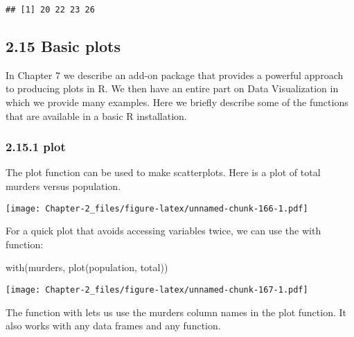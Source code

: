\documentclass[
]{article}
\newenvironment{Shaded}{\begin{snugshade}}{\end{snugshade}}
\newcommand{\DecValTok}[1]{\textcolor[rgb]{0.00,0.00,0.81}{#1}}
\newcommand{\FunctionTok}[1]{\textcolor[rgb]{0.00,0.00,0.00}{#1}}
\newcommand{\NormalTok}[1]{#1}
\newcommand{\OtherTok}[1]{\textcolor[rgb]{0.56,0.35,0.01}{#1}}
\newcommand{\SpecialCharTok}[1]{\textcolor[rgb]{0.00,0.00,0.00}{#1}}
\begin{document}
\begin{verbatim}
## [1] 20 22 23 26
\end{verbatim}

\hypertarget{basic-plots}{%
\subsection{2.15 Basic plots}\label{basic-plots}}

In Chapter 7 we describe an add-on package that provides a powerful
approach to producing plots in R. We then have an entire part on Data
Visualization in which we provide many examples. Here we briefly
describe some of the functions that are available in a basic R
installation.

\hypertarget{plot}{%
\subsubsection{2.15.1 plot}\label{plot}}

The plot function can be used to make scatterplots. Here is a plot of
total murders versus population.

\begin{Shaded}
\end{Shaded}

\texttt{[image: Chapter-2\_files/figure-latex/unnamed-chunk-166-1.pdf]}

For a quick plot that avoids accessing variables twice, we can use the
with function:

\begin{Shaded}
\begin{Highlighting}[]
\FunctionTok{with}\NormalTok{(murders, }\FunctionTok{plot}\NormalTok{(population, total))}
\end{Highlighting}
\end{Shaded}

\texttt{[image: Chapter-2\_files/figure-latex/unnamed-chunk-167-1.pdf]}

The function with lets us use the murders column names in the plot
function. It also works with any data frames and any function.
\end{document}
